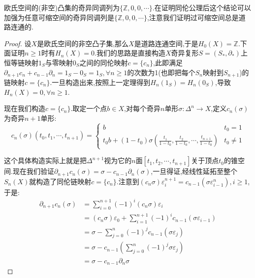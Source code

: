 欧氏空间的(非空)凸集的奇异同调列为$\{\mathbb{Z},0,0,\cdots\}$.在证明同伦公理后这个结论可以加强为任意可缩空间的奇异同调列是$\{\mathbb{Z},0,0,\cdots\}$,注意我们证明过可缩空间总是道路连通的.
\begin{proof}
	
	设$X$是欧氏空间的非空凸子集,那么$X$是道路连通空间,于是$H_0(X)=\mathbb{Z}$.下面证明$n\ge1$时有$H_n(X)=0$.我们的思路是直接构造$X$奇异复形$S=(S_*,\partial_*)$上恒等链映射$1_S$与零映射$0_S$之间的同伦映射$c=\{c_n\}$,此即满足$\partial_{n+1}c_n+c_{n-1}\partial_n=1_S-0_S=1_S,\forall n\ge1$的次数为1(也即把每个$S_n$映射到$S_{n+1}$)的链映射$c=\{c_n\}$.一旦构造出来,按照上一定理得到$H_n(1_S)=H_n(0_S)$,导致$H_n(X)=0,\forall n\ge1$.
	
	现在我们构造$c=\{c_n\}$.取定一个点$b\in X$,对每个奇异$n$单形$\sigma:\Delta^n\to X$,定义$c_n(\sigma)$为奇异$n+1$单形:
	$$c_n(\sigma)(t_0,t_1,\cdots,t_{n+1})=\left\{\begin{array}{cc}b&t_0=1\\ t_0b+(1-t_0)\sigma\left(\frac{t_1}{1-t_0},\frac{t_2}{1-t_0},\cdots,\frac{t_{n+1}}{1-t_0}\right)&t_0\not=1\end{array}\right.$$
	
	这个具体构造实际上就是把$\Delta^{n+1}$视为它的$n$面$[t_1,t_2,\cdots,t_{n+1}]$关于顶点$t_0$的锥空间.现在我们验证$\partial_{n+1}c_n(\sigma)=\sigma-c_{n-1}\partial_n(\sigma)$,一旦得证,经线性延拓至整个$S_n(X)$就构造了同伦链映射$c=\{c_n\}$.注意到$(c_n\sigma)\varepsilon_i^{n+1}=c_{n-1}(\sigma\varepsilon_{i-1}^n),i\ge1$,于是:
	\begin{align*}
	\partial_{n+1}c_n(\sigma)&=\sum_{i=0}^{n+1}(-1)^i(c_n\sigma)\varepsilon_i\\&=(c_n\sigma)\varepsilon_0+\sum_{i=1}^{n+1}(-1)^ic_{n-1}(\sigma\varepsilon_{i-1})\\&=\sigma-\sum_{j=0}^n(-1)^jc_{n-1}(\sigma\varepsilon_j)\\&=\sigma-c_{n-1}\left(\sum_{j=0}^n(-1)^j\sigma\varepsilon_j\right)\\&=\sigma-c_{n-1}\partial_n\sigma
	\end{align*}
\end{proof}

